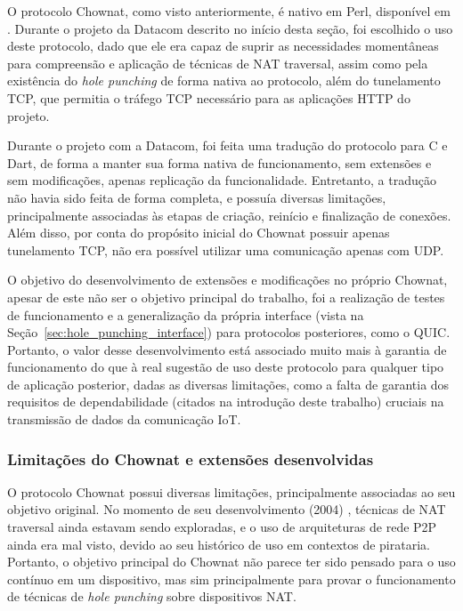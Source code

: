 O protocolo Chownat, como visto anteriormente, é nativo em Perl, disponível em \citep{kamkar2004chownatv07}. Durante o projeto da Datacom descrito no início desta seção, foi escolhido o uso deste protocolo, dado que ele era capaz de suprir as necessidades momentâneas para compreensão e aplicação de técnicas de NAT traversal, assim como pela existência do \textit{hole punching} de forma nativa ao protocolo, além do tunelamento TCP, que permitia o tráfego TCP necessário para as aplicações HTTP do projeto.

Durante o projeto com a Datacom, foi feita uma tradução do protocolo para C e Dart, de forma a manter sua forma nativa de funcionamento, sem extensões e sem modificações, apenas replicação da funcionalidade. Entretanto, a tradução não havia sido feita de forma completa, e possuía diversas limitações, principalmente associadas às etapas de criação, reinício e finalização de conexões. Além disso, por conta do propósito inicial do Chownat possuir apenas tunelamento TCP, não era possível utilizar uma comunicação apenas com UDP.

O objetivo do desenvolvimento de extensões e modificações no próprio Chownat, apesar de este não ser o objetivo principal do trabalho, foi a realização de testes de funcionamento e a generalização da própria interface (vista na Seção~\ref{sec:hole_punching_interface}) para protocolos posteriores, como o QUIC. Portanto, o valor desse desenvolvimento está associado muito mais à garantia de funcionamento do que à real sugestão de uso deste protocolo para qualquer tipo de aplicação posterior, dadas as diversas limitações, como a falta de garantia dos requisitos de dependabilidade (citados na introdução deste trabalho) cruciais na transmissão de dados da comunicação IoT.

\subsubsection{Limitações do Chownat e extensões desenvolvidas}
\label{sec:chownat_limitations}

O protocolo Chownat possui diversas limitações, principalmente associadas ao seu objetivo original. No momento de seu desenvolvimento (2004) \citep{kamkar2004chownat}, técnicas de NAT traversal ainda estavam sendo exploradas, e o uso de arquiteturas de rede P2P ainda era mal visto, devido ao seu histórico de uso em contextos de pirataria. Portanto, o objetivo principal do Chownat não parece ter sido pensado para o uso contínuo em um dispositivo, mas sim principalmente para provar o funcionamento de técnicas de \textit{hole punching} sobre dispositivos NAT.

